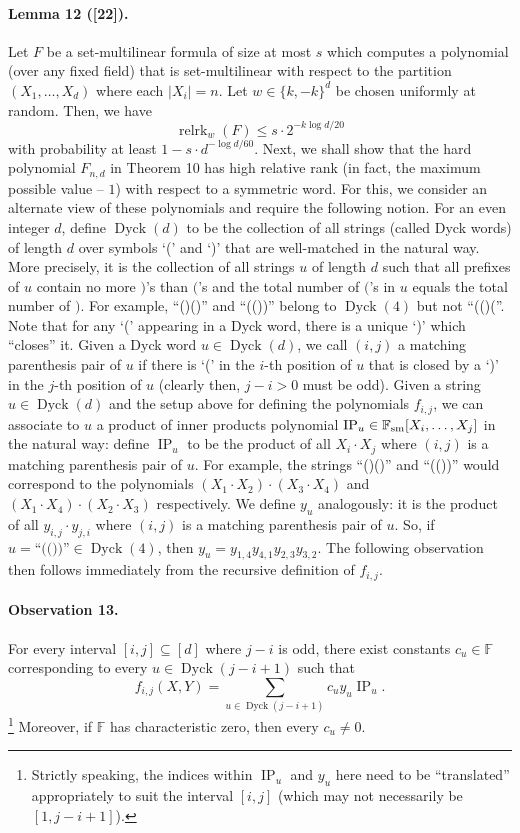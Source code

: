 \documentclass[10pt,a4paper]{article}
\begin{document}
\paragraph{Lemma 12 ([22]).} Let $F$ be a set-multilinear formula of size at most $s$ which computes a polynomial (over any fixed field) that is set-multilinear with respect to the partition $(X_1,\ldots,X_d)$ where each $|X_i|=n$. Let $w\in\{k,-k\}^d$ be chosen uniformly at random. Then, we have
\[\operatorname{relrk}_w(F)\leq s\cdot2^{-k\log d/20}\]
with probability at least $1-s\cdot d^{-\log d/60}$.
Next, we shall show that the hard polynomial $F_{n,d}$ in Theorem 10 has high relative rank (in fact, the maximum possible value -- $1$) with respect to a symmetric word. For this, we consider an alternate view of these polynomials and require the following notion. For an even integer $d$, define $\operatorname{Dyck}(d)$ to be the collection of all strings (called Dyck words) of length $d$ over symbols `(' and `)' that are well-matched in the natural way. More precisely, it is the collection of all strings $u$ of length $d$ such that all prefixes of $u$ contain no more $)$'s than $($'s and the total number of $($'s in $u$ equals the total number of $)$. For example, ``()()'' and ``(())'' belong to $\operatorname{Dyck}(4)$ but not ``(()(''. Note that for any `(' appearing in a Dyck word, there is a unique `)' which ``closes'' it. Given a Dyck word $u\in\operatorname{Dyck}(d)$, we call $(i,j)$ a matching parenthesis pair of $u$ if there is `(' in the $i$-th position of $u$ that is closed by a `)' in the $j$-th position of $u$ (clearly then, $j-i>0$ must be odd).
Given a string $u\in\operatorname{Dyck}(d)$ and the setup above for defining the polynomials $f_{i,j}$, we can associate to $u$ a product of inner products polynomial $\operatorname{IP}_u\in\mathbb F_{\rm sm}[X_i,\ldots,X_j]$ in the natural way: define $\operatorname{IP}_u$ to be the product of all $X_i\cdot X_j$ where $(i,j)$ is a matching parenthesis pair of $u$. For example, the strings ``()()'' and ``(())'' would correspond to the polynomials $(X_1\cdot X_2)\cdot(X_3\cdot X_4)$ and $(X_1\cdot X_4)\cdot(X_2\cdot X_3)$ respectively. We define $y_u$ analogously: it is the product of all $y_{i,j}\cdot y_{j,i}$ where $(i,j)$ is a matching parenthesis pair of $u$. So, if $u=\text{``(())''}\in\operatorname{Dyck}(4)$, then $y_u=y_{1,4}y_{4,1}y_{2,3}y_{3,2}$. The following observation then follows immediately from the recursive definition of $f_{i,j}$.
\paragraph{Observation 13.} For every interval $[i,j]\subseteq[d]$ where $j-i$ is odd, there exist constants $c_u\in\mathbb F$ corresponding to every $u\in\operatorname{Dyck}(j-i+1)$ such that
\[f_{i,j}(X,Y)=\sum_{u\in\operatorname{Dyck}(j-i+1)}c_u y_u\operatorname{IP}_u.\]\footnote{Strictly speaking, the indices within $\operatorname{IP}_u$ and $y_u$ here need to be ``translated'' appropriately to suit the interval $[i,j]$ (which may not necessarily be $[1,j-i+1]$).}
Moreover, if $\mathbb F$ has characteristic zero, then every $c_u\neq0$.
\end{document}
